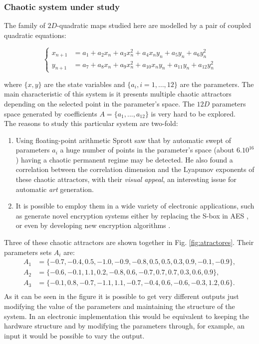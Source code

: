 \subsubsection{Chaotic system under study}  \label{sec:chaos}

The  family of $2D$-quadratic maps studied here are modelled by a pair of coupled quadratic equations:

\begin{equation}\label{eq:mapaSprott}
 \left\{\begin{aligned}
        x_{n+1}&=a_1+a_2 x_n+a_3 x_n^2+a_4 x_n y_n+a_5 y_n+a_6 y_n^2\\
        y_{n+1}&=a_7+a_8 x_n+a_9 x_n^2+a_{10} x_n y_n+a_{11} y_n+a_{12} y_n^2
       \end{aligned}
 \right.
\end{equation}

where $\{x,y\}$ are the state variables and $\{a_i, i=1,\dots,12\}$
are the parameters. 
The main characteristic of this system is it presents multiple chaotic attractors depending on the selected
point in the parameter's space. The $12D$ parameters space generated by coefficients $A=\{a_1,...,a_{12}\}$  is very hard to be explored. \\
The reasons to study this particular system are two-fold: 

\begin{enumerate}
\item Using floating-point arithmetic Sprott saw
that by automatic swept of parameters $a_i$ a huge number of
points in the parameter's space (about $6  .  10^{16}$) having
a chaotic permanent regime may be detected. He also
found a correlation between the correlation dimension and the
Lyapunov exponents of these chaotic attractors, with their
\textsl{visual appeal}, an interesting issue for automatic
\textsl{art} generation.
\item It is possible to employ them in a wide variety of electronic applications, such as generate novel encryption systems either by replacing the S-box in AES \cite{Ahmad2013,Hussain2013}, or even by developing new encryption algorithms \cite{Machado2004,Smaoui2009}. 
\end{enumerate}

Three of these chaotic attractors are shown together in Fig. \ref{fig:atractores}. Their parameters sets $A_i$ are:
%
\begin{align*}
A_1&=\{-0.7,-0.4,0.5,-1.0,-0.9,-0.8,0.5,0.5,0.3,0.9,-0.1,-0.9\},\nonumber\\
A_2&=\{-0.6,-0.1,1.1,0.2,-0.8,0.6,-0.7,0.7,0.7,0.3,0.6,0.9\}, \nonumber\\
A_3&=\{ -0.1,0.8,-0.7,-1.1,1.1,-0.7,-0.4,0.6,-0.6,-0.3,1.2,0.6\}.\nonumber\\
\end{align*}
%
As it can be seen in the figure it is possible to get very different outputs just modifying the value of the parameters and maintaining the structure of the system. In an electronic implementation this would be equivalent to keeping the hardware structure and by modifying the parameters through, for example, an input it would be possible to vary the output.


